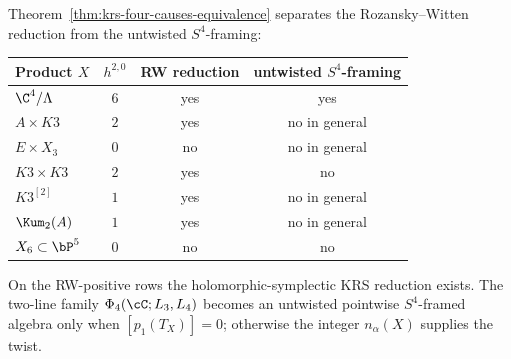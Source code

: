 \begin{corollary}
\label{cor:product-cy4-phi-4-descent}
Theorem~\ref{thm:krs-four-causes-equivalence} separates the
Rozansky--Witten reduction from the untwisted \(S^4\)-framing:
\begin{center}
\renewcommand{\arraystretch}{1.3}
\begin{tabular}{lccc}
\toprule
Product \(X\) & \(h^{2,0}\) & RW reduction & untwisted \(S^4\)-framing \\
\midrule
\(\C^4/\Lambda\) & \(6\) & yes & yes \\
\(A\times K3\) & \(2\) & yes & no in general \\
\(E\times X_3\) & \(0\) & no & no in general \\
\(K3\times K3\) & \(2\) & yes & no \\
\(K3^{[2]}\) & \(1\) & yes & no in general \\
\(\Kum_2(A)\) & \(1\) & yes & no in general \\
\(X_6\subset\bP^5\) & \(0\) & no & no \\
\bottomrule
\end{tabular}
\end{center}
On the RW-positive rows the holomorphic-symplectic KRS reduction exists.
The two-line family \(\Phi_4(\cC;L_3,L_4)\) becomes an untwisted pointwise
\(S^4\)-framed algebra only when \([p_1(T_X)]=0\); otherwise the integer
\(n_\alpha(X)\) supplies the twist.
\end{corollary}

